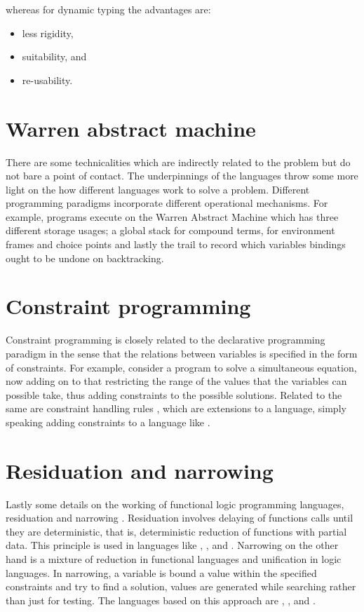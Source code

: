 \documentclass[proposal.tex]{subfiles}
\begin{document}
whereas for dynamic typing the advantages are:
\begin{itemize}
\item less rigidity,
\item suitability, and
\item re-usability.
\end{itemize}

\section{Warren abstract machine}
There are some technicalities which are indirectly related to the problem but do not bare a point of contact.
The underpinnings of the languages throw some more light on the how different languages work to solve a problem.
Different programming paradigms incorporate different operational mechanisms.
For example,  programs execute on the Warren Abstract Machine \cite{ait1999warren} which has three
different storage usages; a global stack for compound terms, for environment frames and choice points and lastly
the trail to record which variables bindings ought to be undone on backtracking.

\section{Constraint programming}
Constraint programming \cite{website:constraintprogwiki} is closely related to the declarative programming paradigm
in the sense that the relations between variables is specified in the form of constraints.
For example, consider a program to solve a simultaneous equation, now adding on to that restricting the range of
the values that the variables can possible take, thus adding constraints to the possible solutions.
Related to the same are constraint handling rules \cite{website:chrwiki}, which are extensions to a language,
simply speaking adding constraints to a language like .


\section{Residuation and narrowing}
Lastly some details on the working of functional logic programming languages, residuation and narrowing
\cite{hanus1995curry,webiste:wikicurry}.
Residuation involves delaying of functions calls until they are deterministic, that is, deterministic reduction of
functions with partial data.
This principle is used in languages like  \cite{lloyd1999programming:escher}, 
\cite{website:life},  \cite{website:nue-prolog} and  \cite{website:oz-mozart}.
Narrowing on the other hand is a mixture of reduction in functional languages and unification in logic languages.
In narrowing, a variable is bound a value within the specified constraints and try to find a solution, values are
generated while searching rather than just for testing.
The languages based on this approach are  \cite{website:alf},  \cite{website:babel},
 \cite{bert1987lpg} and  \cite{website:curry}.
\end{document}
